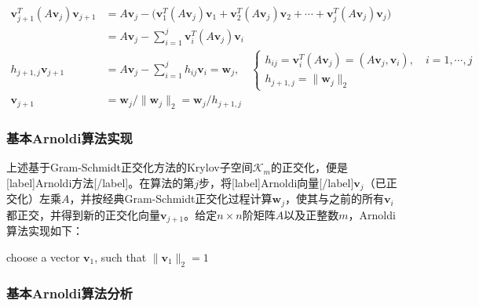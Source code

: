 \documentclass[UTF8,nofonts]{ctexart}
\begin{document}
\begin{align*}
\boldsymbol{v}_{j+1}^T(A\boldsymbol{v}_j)\boldsymbol{v}_{j+1}&=
A\boldsymbol{v}_j-\Big(\boldsymbol{v}_1^T(A\boldsymbol{v}_j)\boldsymbol{v}_1+\boldsymbol{v}_2^T(A\boldsymbol{v}_j)\boldsymbol{v}_2+\cdots+\boldsymbol{v}_j^T(A\boldsymbol{v}_j)\boldsymbol{v}_j\Big)\\
&=A\boldsymbol{v}_j-\sum_{i=1}^j\boldsymbol{v}_i^T(A\boldsymbol{v}_j)\boldsymbol{v}_i \\
h_{j+1,j}\boldsymbol{v}_{j+1}&=A\boldsymbol{v}_j-\sum_{i=1}^jh_{ij}\boldsymbol{v}_i=\boldsymbol{w}_j,\quad\begin{cases}
h_{ij}=\boldsymbol{v}_i^T(A\boldsymbol{v}_j)=\left(A\boldsymbol{v}_j,\boldsymbol{v}_i\right),\quad i=1,\cdots,j \\
h_{j+1,j}=\|\boldsymbol{w}_j\|_2
\end{cases} \\
\boldsymbol{v}_{j+1}&=\boldsymbol{w}_j/\|\boldsymbol{w}_j\|_2=\boldsymbol{w}_j/h_{j+1,j}
\end{align*}

\subsubsection*{基本Arnoldi算法实现}

上述基于Gram-Schmidt正交化方法的Krylov子空间$\mathcal{K}_m$的正交化，便是[label]Arnoldi方法[/label]。在算法的第$j$步，将[label]Arnoldi向量[/label]$\boldsymbol{v}_j$（已正交化）左乘$A$，并按经典Gram-Schmidt正交化过程计算$\boldsymbol{w}_j$，使其与之前的所有$\boldsymbol{v}_i$都正交，并得到新的正交化向量$\boldsymbol{v}_{j+1}$。给定$n \times n$阶矩阵$A$以及正整数$m$，Arnoldi算法实现如下：

\begin{algorithm}[H]
choose a vector $\boldsymbol{v}_1$, such that $\|\boldsymbol{v}_1\|_2=1$\;
\end{algorithm}

\subsubsection*{基本Arnoldi算法分析}
\end{document}
